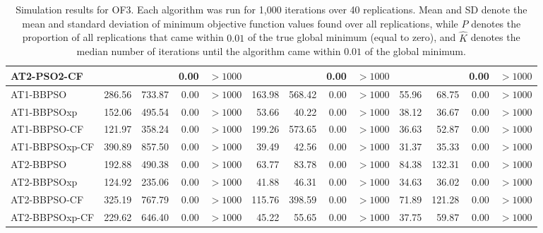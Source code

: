 \documentclass[cmbright]{staauth}
\numberwithin{table}{section}
\begin{document}
\begin{table}[ht]
\begin{tabular}{l|rrrr|rrrr|rrrr}
  AT2-PSO2-CF &  &  & 0.00 & $> 1000$ &  &  & 0.00 & $> 1000$ &  &  & 0.00 & $> 1000$ \\
   \hline
AT1-BBPSO & 286.56 & 733.87 & 0.00 & $> 1000$ & 163.98 & 568.42 & 0.00 & $> 1000$ & 55.96 & 68.75 & 0.00 & $> 1000$ \\
  AT1-BBPSOxp & 152.06 & 495.54 & 0.00 & $> 1000$ & 53.66 & 40.22 & 0.00 & $> 1000$ & 38.12 & 36.67 & 0.00 & $> 1000$ \\
  AT1-BBPSO-CF & 121.97 & 358.24 & 0.00 & $> 1000$ & 199.26 & 573.65 & 0.00 & $> 1000$ & 36.63 & 52.87 & 0.00 & $> 1000$ \\
  AT1-BBPSOxp-CF & 390.89 & 857.50 & 0.00 & $> 1000$ & 39.49 & 42.56 & 0.00 & $> 1000$ & 31.37 & 35.33 & 0.00 & $> 1000$ \\
   \hline
AT2-BBPSO & 192.88 & 490.38 & 0.00 & $> 1000$ & 63.77 & 83.78 & 0.00 & $> 1000$ & 84.38 & 132.31 & 0.00 & $> 1000$ \\
  AT2-BBPSOxp & 124.92 & 235.06 & 0.00 & $> 1000$ & 41.88 & 46.31 & 0.00 & $> 1000$ & 34.63 & 36.02 & 0.00 & $> 1000$ \\
  AT2-BBPSO-CF & 325.19 & 767.79 & 0.00 & $> 1000$ & 115.76 & 398.59 & 0.00 & $> 1000$ & 71.89 & 121.28 & 0.00 & $> 1000$ \\
  AT2-BBPSOxp-CF & 229.62 & 646.40 & 0.00 & $> 1000$ & 45.22 & 55.65 & 0.00 & $> 1000$ & 37.75 & 59.87 & 0.00 & $> 1000$ \\
   \hline
\end{tabular}
\endgroup
\caption{Simulation results for OF3. Each algorithm was run for 1,000 iterations over 40 replications. Mean and SD denote the mean and standard deviation of minimum objective function values found over all replications, while $\widehat{P}$ denotes the proportion of all replications that came within $0.01$ of the true global minimum (equal to zero), and $\widehat{K}$ denotes the median number of iterations until the algorithm came within $0.01$ of the global minimum.}
\label{tab:psosim3}
\end{table}
\end{document}
